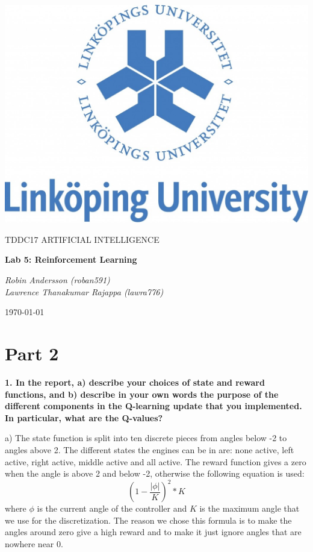 \documentclass[a4paper,10pt]{article}
\begin{document}
\begin{titlepage}
	\centering
	\includegraphics[width=.6\textwidth]{liu-logo.png}\par
	\vfill
	{\scshape\Large TDDC17 ARTIFICIAL INTELLIGENCE\par}
	{\huge\bfseries Lab 5: Reinforcement Learning\par}
	\vspace{1cm}
	{\large\itshape Robin Andersson (roban591) \\ Lawrence Thanakumar Rajappa (lawra776)\par}
	\vfill
	{\large \today\par}
\end{titlepage}

\section*{Part 2}

\textbf{1. In the report, 
a) describe your choices of state and reward functions, and
b) describe in your own words the purpose of the different components in the Q-learning 
update that you implemented. In particular, what are the Q-values?}

a)
The state function is split into ten discrete pieces from angles below -2 to angles above 2.
The different states the engines can be in are: none active, left active, right active, middle active and all active.
The reward function gives a zero when the angle is above 2 and below -2,
otherwise the following equation is used:
\begin{equation}
  \left(1 - \frac{|\phi|}{K}\right)^2 * K \label{eq:reward}
\end{equation} 
where $\phi$ is the current angle of the controller and $K$ is the maximum angle that we use for the discretization.
The reason we chose this formula is to make the angles around zero give a high reward and to make it just ignore angles
that are nowhere near 0.
\end{document}
